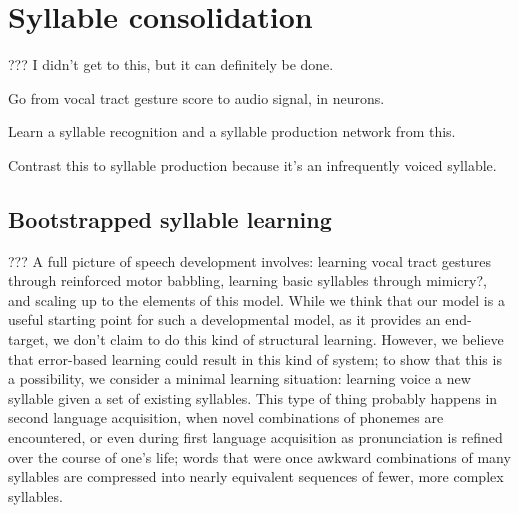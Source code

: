 

\section{Syllable consolidation}

??? I didn't get to this,
but it can definitely be done.

Go from vocal tract gesture score
to audio signal, in neurons.

Learn a syllable recognition
and a syllable production
network from this.

Contrast this to syllable production because it's
an infrequently voiced syllable.

\subsection{Bootstrapped syllable learning}

??? A full picture of speech development involves:
learning vocal tract gestures
through reinforced motor babbling,
learning basic syllables
through mimicry?,
and scaling up to the elements of this model.
While we think that our model
is a useful starting point for such
a developmental model,
as it provides an end-target,
we don't claim to do this kind of structural learning.
However, we believe that error-based learning
could result in this kind of system;
to show that this is a possibility,
we consider a minimal learning situation:
learning voice a new syllable
given a set of existing syllables.
This type of thing probably happens
in second language acquisition,
when novel combinations of phonemes
are encountered,
or even during first language acquisition
as pronunciation is refined over
the course of one's life;
words that were once awkward combinations
of many syllables are compressed into
nearly equivalent sequences of fewer,
more complex syllables.

